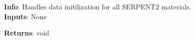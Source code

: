 \textbf{Info}: Handles data initilization for all SERPENT2 materials. \\

\noindent \textbf{Inputs}: None

\noindent \textbf{Returns}: void
